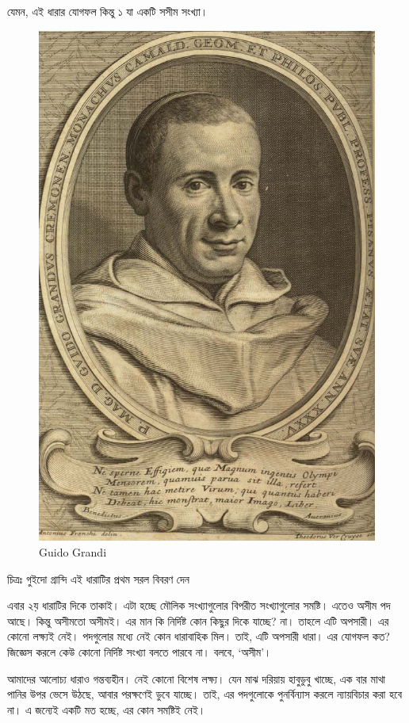 \documentclass[
]{book}
\begin{document}
যেমন, এই ধারার যোগফল কিন্তু ১ যা একটি সসীম সংখ্যা।

\begin{figure}

{\centering \includegraphics[width=0.8\linewidth]{img/grandi} 

}

\caption{Guido Grandi}\label{fig:grandi}
\end{figure}

চিত্রঃ গুইদো গ্রান্দি এই ধারাটির প্রথম সরল বিবরণ দেন

এবার ২য় ধারাটির দিকে তাকাই। এটা হচ্ছে মৌলিক সংখ্যাগুলোর বিপরীত সংখ্যাগুলোর সমষ্টি। এতেও অসীম পদ আছে। কিন্তু অসীমতো অসীমই। এর মান কি নির্দিষ্ট কোন কিছুর দিকে যাচ্ছে? না। তাহলে এটি অপসারী। এর কোনো লক্ষ্যই নেই। পদগুলোর মধ্যে নেই কোন ধারাবাহিক মিল। তাই, এটি অপসারী ধারা। এর যোগফল কত? জিজ্ঞেস করলে কেউ কোনো নির্দিষ্ট সংখ্যা বলতে পারবে না। বলবে, `অসীম'।

আমাদের আলোচ্য ধারাও গন্তব্যহীন। নেই কোনো বিশেষ লক্ষ্য। যেন মাঝ দরিয়ায় হাবুডুবু খাচ্ছে, এক বার মাথা পানির উপর ভেসে উঠছে, আবার পরক্ষণেই ডুবে যাচ্ছে। তাই, এর পদগুলোকে পুনর্বিন্যাস করলে ন্যায়বিচার করা হবে না। এ জন্যেই একটি মত হচ্ছে, এর কোন সমষ্টিই নেই।
\end{document}
